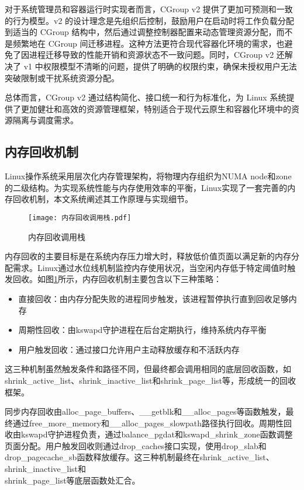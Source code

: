对于系统管理员和容器运行时实现者而言，CGroup v2 提供了更加可预测和一致的行为模型。v2 的设计理念是先组织后控制，鼓励用户在启动时将工作负载分配到适当的 CGroup 结构中，然后通过调整控制器配置来动态管理资源分配，而不是频繁地在 CGroup 间迁移进程。这种方法更符合现代容器化环境的需求，也避免了因进程迁移导致的性能开销和资源状态不一致问题。同时，CGroup v2 还解决了 v1 中权限模型不清晰的问题，提供了明确的权限约束，确保未授权用户无法突破限制或干扰系统资源分配。

总体而言，CGroup v2 通过结构简化、接口统一和行为标准化，为 Linux 系统提供了更加健壮和高效的资源管理框架，特别适合于现代云原生和容器化环境中的资源隔离与调度需求。

\subsection{内存回收机制}
\label{sec:Linux内存回收机制}

Linux操作系统采用层次化内存管理架构，将物理内存组织为NUMA node和zone的二级结构。为实现系统性能与内存使用效率的平衡，Linux实现了一套完善的内存回收机制，本文系统阐述其工作原理与实现细节。

\begin{figure}[htb]
    \centering
    \texttt{[image: 内存回收调用栈.pdf]}
    \caption{内存回收调用栈}
    \label{fig:memory_reclaim_callgraph}
\end{figure}

内存回收的主要目标是在系统内存压力增大时，释放低价值页面以满足新的内存分配需求。Linux通过水位线机制监控内存使用状况，当空闲内存低于特定阈值时触发回收。如图\ref{fig:memory_reclaim_callgraph}所示，内存回收机制主要包含以下三种策略：

\begin{itemize}
    \item 直接回收：由内存分配失败的进程同步触发，该进程暂停执行直到回收足够内存
    \item 周期性回收：由kswapd守护进程在后台定期执行，维持系统内存平衡
    \item 用户触发回收：通过接口允许用户主动释放缓存和不活跃内存
\end{itemize}

这三种机制虽然触发条件和路径不同，但最终都会调用相同的底层回收函数，如shrink\_active\_list、shrink\_inactive\_list和shrink\_page\_list等，形成统一的回收框架。

同步内存回收由alloc\_page\_buffers、\_\_getblk和\_\_alloc\_pages等函数触发，最终通过free\_more\_memory和\_\_alloc\_pages\_slowpath路径执行回收。周期性回收由kswapd守护进程负责，通过balance\_pgdat和kswapd\_shrink\_zone函数调整页面分配。用户触发回收则通过drop\_caches接口实现，使用drop\_slab和drop\_pagecache\_sb函数释放缓存。这三种机制最终在shrink\_active\_list、shrink\_inactive\_list和\\shrink\_page\_list等底层函数处汇合。

